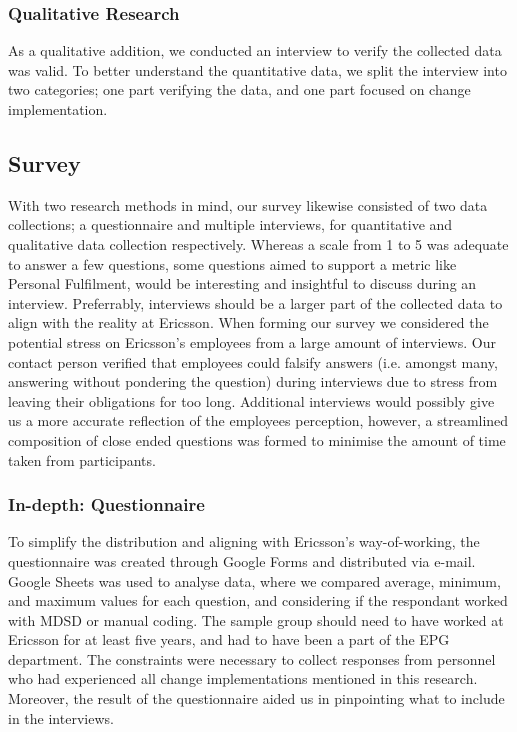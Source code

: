 \documentclass[final_report_innit.tex]{subfiles}
\begin{document}
\subsubsection{Qualitative Research}
As a qualitative addition, we conducted an interview to verify the collected data was valid. To better understand the quantitative data, we split the interview into two categories; one part verifying the data, and one part focused on change implementation.

\subsection{Survey}
With two research methods in mind, our survey likewise consisted of two data collections; a questionnaire and multiple interviews, for quantitative and qualitative data collection respectively. Whereas a scale from 1 to 5 was adequate to answer a few questions, some questions aimed to support a metric like Personal Fulfilment, would be interesting and insightful to discuss during an interview. Preferrably, interviews should be a larger part of the collected data to align with the reality at Ericsson. When forming our survey we considered the potential stress on Ericsson's employees from a large amount of interviews. Our contact person verified that employees could falsify answers (i.e. amongst many, answering without pondering the question) during interviews due to stress from leaving their obligations for too long. Additional interviews would possibly give us a more accurate reflection of the employees perception, however, a streamlined composition of close ended questions was formed to minimise the amount of time taken from participants.
\\
\subsubsection{In-depth: Questionnaire}
To simplify the distribution and aligning with Ericsson's way-of-working, the questionnaire was created through Google Forms and distributed via e-mail. Google Sheets was used to analyse data, where we compared average, minimum, and maximum values for each question, and considering if the respondant worked with MDSD or manual coding. The sample group should need to have worked at Ericsson for at least five years, and had to have been a part of the EPG department. The constraints were necessary to collect responses from personnel who had experienced all change implementations mentioned in this research. Moreover, the result of the questionnaire aided us in pinpointing what to include in the interviews.
\\
\end{document}
